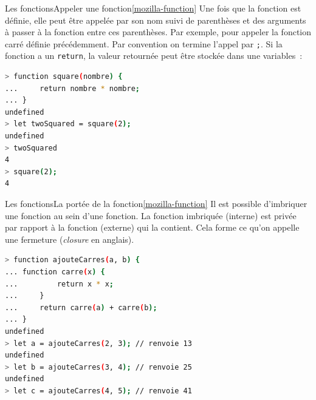 \documentclass{beamer}
\begin{document}
    \begin{frame}[fragile]{Les fonctions}{Appeler une fonction\cref{mozilla-function}}
        Une fois que la fonction est définie, elle peut être appelée par son nom suivi de parenthèses et des arguments à passer à la fonction entre ces parenthèses.
        Par exemple, pour appeler la fonction carré définie précédemment.
        Par convention on termine l'appel par \lstinline{;}.
        Si la fonction a un \lstinline{return}, la valeur retournée peut être stockée dans une variables~:
        \begin{lstlisting}[language=Bash,title={\tiny{Node.js}}]
> function square(nombre) {
...     return nombre * nombre;
... }
undefined
> let twoSquared = square(2);
undefined
> twoSquared
4
> square(2);
4
        \end{lstlisting}
    \end{frame}

    \begin{frame}[fragile]{Les fonctions}{La portée de la fonction\cref{mozilla-function}}
        Il est possible d'imbriquer une fonction au sein d'une fonction.
        La fonction imbriquée (interne) est privée par rapport à la fonction (externe) qui la contient.
        Cela forme ce qu'on appelle une fermeture (\textit{closure} en anglais).
        \begin{lstlisting}[language=Bash,title={\tiny{Node.js}}]
> function ajouteCarres(a, b) {
... function carre(x) {
...         return x * x;
...     }
...     return carre(a) + carre(b);
... }
undefined
> let a = ajouteCarres(2, 3); // renvoie 13
undefined
> let b = ajouteCarres(3, 4); // renvoie 25
undefined
> let c = ajouteCarres(4, 5); // renvoie 41
        \end{lstlisting}
    \end{frame}
\end{document}
